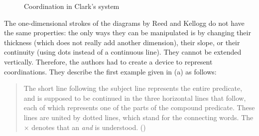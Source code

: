 \documentclass[english,output=paper,colorlinks,citecolor=brown]{../langscibook}
\begin{document}
\begin{figure}[t]
    \caption{Coordination in Clark’s system\label{fig:4:7}}
\end{figure}
 


The one-dimensional strokes of the diagrams by Reed and Kellogg do not have the same properties: the only ways they can be manipulated is by changing their thickness (which does not really add another dimension), their slope, or their continuity (using dots instead of a continuous line). They cannot be extended vertically. Therefore, the authors had to create a device to represent coordinations. They describe the first example given in (a) as follows:

\begin{quote}
The short line following the subject line represents the entire predicate, and is supposed to be continued in the three horizontal lines that follow, each of which represents one of the parts of the compound predicate. These lines are united by dotted lines, which stand for the connecting words. The × denotes that an \textit{and} is understood. (\citealt[47--48]{ReedBrainerd1879})
\end{quote}
\end{document}
